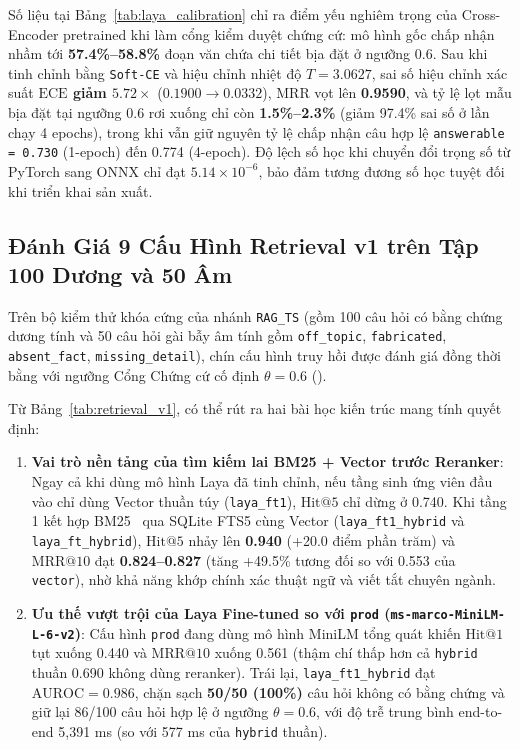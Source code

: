 

Số liệu tại Bảng~\ref{tab:laya_calibration} chỉ ra điểm yếu nghiêm trọng của Cross-Encoder pretrained khi làm cổng kiểm duyệt chứng cứ: mô hình gốc chấp nhận nhầm tới \textbf{57.4\%--58.8\%} đoạn văn chứa chi tiết bịa đặt ở ngưỡng 0.6. Sau khi tinh chỉnh bằng \texttt{Soft-CE} và hiệu chỉnh nhiệt độ $T = 3.0627$, sai số hiệu chỉnh xác suất \textbf{$\mathrm{ECE}$ giảm $5.72\times$} ($0.1900 \rightarrow 0.0332$), $\mathrm{MRR}$ vọt lên \textbf{0.9590}, và tỷ lệ lọt mẫu bịa đặt tại ngưỡng 0.6 rơi xuống chỉ còn \textbf{1.5\%--2.3\%} (giảm 97.4\% sai số ở lần chạy 4 epochs), trong khi vẫn giữ nguyên tỷ lệ chấp nhận câu hợp lệ \texttt{answerable = 0.730} (1-epoch) đến 0.774 (4-epoch). Độ lệch số học khi chuyển đổi trọng số từ PyTorch sang ONNX chỉ đạt $5.14 \times 10^{-6}$, bảo đảm tương đương số học tuyệt đối khi triển khai sản xuất.

\subsection{Đánh Giá 9 Cấu Hình Retrieval v1 trên Tập 100 Dương và 50 Âm}
\label{sec:ch5_retrieval_v1}

Trên bộ kiểm thử khóa cứng  của nhánh \texttt{RAG\_TS} (gồm 100 câu hỏi có bằng chứng dương tính và 50 câu hỏi gài bẫy âm tính gồm \texttt{off\_topic}, \texttt{fabricated}, \texttt{absent\_fact}, \texttt{missing\_detail}), chín cấu hình truy hồi được đánh giá đồng thời bằng  với ngưỡng Cổng Chứng cứ cố định $\theta = 0.6$ ().



Từ Bảng~\ref{tab:retrieval_v1}, có thể rút ra hai bài học kiến trúc mang tính quyết định:
\begin{enumerate}[label=\textbf{\arabic*.}]
  \item \textbf{Vai trò nền tảng của tìm kiếm lai BM25 + Vector trước Reranker}: Ngay cả khi dùng mô hình Laya đã tinh chỉnh, nếu tầng sinh ứng viên đầu vào chỉ dùng Vector thuần túy (\texttt{laya\_ft1}), $\mathrm{Hit}@5$ chỉ dừng ở 0.740. Khi tầng 1 kết hợp BM25~\cite{robertson2009probabilistic} qua SQLite FTS5 cùng Vector (\texttt{laya\_ft1\_hybrid} và \texttt{laya\_ft\_hybrid}), $\mathrm{Hit}@5$ nhảy lên \textbf{0.940} (+20.0 điểm phần trăm) và $\mathrm{MRR}@10$ đạt \textbf{0.824--0.827} (tăng +49.5\% tương đối so với 0.553 của \texttt{vector}), nhờ khả năng khớp chính xác thuật ngữ và viết tắt chuyên ngành.
  \item \textbf{Ưu thế vượt trội của Laya Fine-tuned so với \texttt{prod} (\texttt{ms-marco-MiniLM-L-6-v2})}: Cấu hình \texttt{prod} đang dùng mô hình MiniLM tổng quát khiến $\mathrm{Hit}@1$ tụt xuống 0.440 và $\mathrm{MRR}@10$ xuống 0.561 (thậm chí thấp hơn cả \texttt{hybrid} thuần 0.690 không dùng reranker). Trái lại, \texttt{laya\_ft1\_hybrid} đạt \textbf{$\mathrm{AUROC} = 0.986$}, chặn sạch \textbf{50/50 (100\%)} câu hỏi không có bằng chứng và giữ lại 86/100 câu hỏi hợp lệ ở ngưỡng $\theta = 0.6$, với độ trễ trung bình end-to-end 5,391 ms (so với 577 ms của \texttt{hybrid} thuần).
\end{enumerate}

